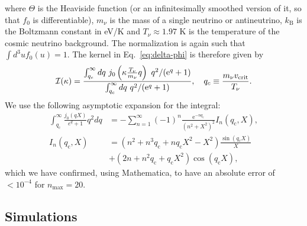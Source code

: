 \documentclass[useAMS, usenatbib]{mnras}
\newcommand{\barr}{\begin{eqnarray}}
\newcommand{\earr}{\end{eqnarray}}
\newcommand{\rme}{\textrm{e}}
\begin{document}
where $\Theta$ is the Heaviside function (or an infinitesimally smoothed version of it, so that $f_0$ is differentiable), $m_\nu$ is the mass of a single neutrino or antineutrino, $k_\mathrm{B}$ is the Boltzmann constant in eV/K and $T_\nu \approx 1.97$ K is the temperature of the cosmic neutrino background. The normalization is again such that $\int d^3 u f_0(u) = 1$. The kernel in Eq.~\eqref{eq:delta-phi} is therefore given by
\barr
\mathcal{I}(\kappa) = \frac{\int_{q_c}^{\infty} dq~ j_0\left(\kappa \frac{T_\nu}{m_\nu}q\right)~ q^2 /(\rme^q + 1) }{\int_{q_c}^{\infty} dq ~q^2/(\rme^q + 1)}, \ \ \ q_c \equiv \frac{m_\nu v_{\rm crit}}{T_\nu}.
\earr
We use the following asymptotic expansion for the integral:
\begin{align}
 \int^\infty_{q_\mathrm{c}} \frac{j_0(qX)}{e^q + 1} q^2 dq &= - \sum^{\infty}_{n=1} (-1)^n \frac{\rme^{-n q_\mathrm{c}}}{(n^2+X^2)^2} I_n(q_\mathrm{c},X),\\
 I_n(q_\mathrm{c},X) &= \left(n^2 + n^3 q_\mathrm{c} + n q_\mathrm{c} X^2 - X^2\right) \frac{\sin(q_\mathrm{c} X)}{X} \nonumber \\
 &+ \left(2n + n^2 q_\mathrm{c} + q_\mathrm{c} X^2\right) \cos(q_\mathrm{c} X),
\end{align}
which we have confirmed, using Mathematica, to have an absolute error of $< 10^{-4}$ for $n_\mathrm{max} = 20$.

\subsection{Simulations}
\label{sec:simulations}
\end{document}

